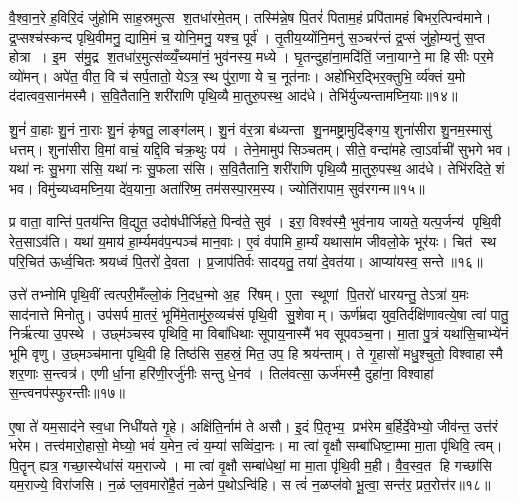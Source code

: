 वै॒श्वा॒न॒रे ह॒विरि॒दं जु॑होमि साह॒स्रमुत्स श॒तधा॑रमे॒तम्। तस्मि॑न्ने॒ष पि॒तरं॑ पिताम॒हं प्रपि॑तामहं बिभर॒त्पिन्व॑माने। द्र॒प्सश्च॑स्कन्द पृथि॒वीमनु॒ द्यामि॒मं च॒ योनि॒मनु॒ यश्च॒ पूर्व॑। तृ॒तीय॒य्योंनि॒मनु॑ स॒ञ्चर॑न्तं द्र॒प्सं जु॑हो॒म्यनु॑ स॒प्त होत्रा। इ॒म स॑मु॒द्र श॒तधा॑र॒मुत्स॑व्व्यँ॒च्यमा॑नं॒ भुव॑नस्य॒ मध्ये। घृ॒तन्दुहा॑ना॒मदि॑तिं॒ जना॒याग्ने॒ मा हिसीः पर॒मे व्यो॑मन्। अपे॑त॒ वीत॒ वि च॑ सर्प॒तातो॒ येऽत्र॒ स्थ पु॑रा॒णा ये च॒ नूत॑नाः। अहो॑भिर॒द्भिर॒क्तुभि॒ र्व्य॑क्तं य॒मो द॑दात्वव॒सान॑मस्मै। स॒वि॒तैतानि॒ शरी॑राणि पृथि॒व्यै मा॒तुरु॒पस्थ॒ आद॑धे। तेभि॑र्युज्यन्तामघ्नि॒याः॥१४॥

शु॒नं॑ वा॒हाः  शु॒नं ना॒राः  शु॒नं कृ॑षतु॒ लाङ्ग॑लम्। शु॒नं व॑र॒त्रा ब॑ध्यन्ता शु॒नमष्ट्रा॒मुदि॑ङ्गय॒ शुना॑सीरा शु॒नम॒स्मासु॑ धत्तम्। शुना॑सीरा वि॒मां वाचं॒ यद्दि॒वि च॑क्र॒थुः पय॑। तेने॒मामुप॑ सिञ्चतम्। सीते॒ वन्दा॑महे त्वा॒ऽर्वाची॑ सुभगे भव। यथा॑ नः सु॒भगा स॑सि॒ यथा॑ नः सु॒फला स॑सि। स॒वि॒तैतानि॒ शरी॑राणि पृथि॒व्यै मा॒तुरु॒पस्थ॒ आद॑धे। तेभि॑रदिते॒ शं भव। विमु॑च्यध्वमघ्नि॒या दे॑व॒याना॒ अता॑रिष्म॒ तम॑सस्पा॒रम॒स्य। ज्योति॑रापाम॒ सुव॑रगन्म॥१५॥

प्र वाता॒ वान्ति॑ प॒तय॑न्ति वि॒द्युत॒ उदोष॑धीर्जिहते॒ पिन्व॑ते॒ सुव॑। इरा॒ विश्व॑स्मै॒ भुव॑नाय जायते॒ यत्प॒र्जन्य॑ पृथि॒वी रेत॒साऽव॑ति। यथा॑ य॒माय॑ हा॒र्म्यमव॑प॒न्पञ्च॑ मान॒वाः। ए॒वं व॑पामि हा॒र्म्यं यथासा॑म जीवलो॒के भूर॑यः। चित॑ स्थ परि॒चित॑ ऊर्ध्व॒चितः  श्रयध्वं पि॒तरो॑ दे॒वता। प्र॒जाप॑तिर्वः सादयतु॒ तया॑ दे॒वत॑या। आप्या॑यस्व॒ सन्ते॥१६॥
\anuvakamend[अ॒घ्नि॒या अ॑गन्म स॒प्त च॑]

उत्ते॑ तभ्नोमि पृथि॒वीं त्वत्परी॒मँल्लो॒कं नि॒दध॒न्मो अ॒ह रि॑षम्। ए॒ता स्थूणां पि॒तरो॑ धारयन्तु॒ तेऽत्रा॑ य॒मः साद॑नात्ते मिनोतु। उप॑सर्प मा॒तरं॒ भूमि॑मे॒तामु॑रु॒व्यच॑सं पृथि॒वी सु॒शेवाम्। ऊर्ण॑म्रदा युव॒तिर्दक्षि॑णावत्ये॒षा त्वा॑ पातु॒ निर्\mbox{}ऋ॑त्या उ॒पस्थे। उछ्म॑ञ्चस्व पृथिवि॒ मा विबा॑धिथाः सूपाय॒नास्मै॑ भव सूपवञ्च॒ना। मा॒ता पु॒त्रं यथा॑सि॒चाभ्ये॑नं भूमि वृणु। उ॒छ्मञ्च॑माना पृथि॒वी हि तिष्ठ॑सि स॒हस्रं॒ मित॒ उप॒ हि श्रय॑न्ताम्। ते गृ॒हासो॑ मधु॒श्चुतो॒ विश्वाहास्मै शर॒णाः स॒न्त्वत्र॑। एणीर्धा॒ना हरि॑णी॒रर्जु॑नीः सन्तु धे॒नव॑। तिल॑वत्सा॒ ऊर्ज॑मस्मै॒ दुहा॑ना॒ विश्वाहा॑ स॒न्त्वनप॑स्फुरन्तीः॥१७॥

ए॒षा ते॑ यम॒साद॑ने स्व॒धा निधी॑यते गृ॒हे। अक्षि॑ति॒र्नाम॑ ते असौ। इ॒दं पि॒तृभ्य॒ प्रभ॑रेम ब॒र्\mbox{}हिर्दे॒वेभ्यो॒ जीव॑न्त॒ उत्त॑रं भरेम। तत्त्व॑मारो॒हासो॒ मेघ्यो॒ भवं॑ य॒मेन॒ त्वं य॒म्या॑ सव्विंदा॒नः। मा त्वा॑ वृ॒क्षौ सम्बा॑धिष्टा॒म्मा मा॒ता पृ॑थिवि॒ त्वम्। पि॒तॄन् ह्यत्र॒ गच्छा॒स्येधा॑सं यम॒राज्ये। मा त्वा॑ वृ॒क्षौ सम्बा॑धेथां॒ मा मा॒ता पृ॑थि॒वी म॒ही। वै॒व॒स्व॒त हि गच्छा॑सि यम॒राज्ये॒ विरा॑जसि। न॒ळं प्ल॒वमारो॑है॒तं न॒ळेन॑ प॒थोऽन्वि॑हि। स त्वं॑ न॒ळप्ल॑वो भू॒त्वा॒ सन्त॑र॒ प्रत॒रोत्त॑र॥१८॥

